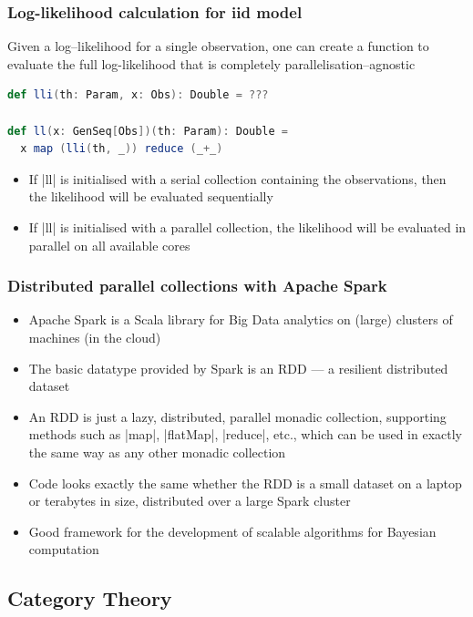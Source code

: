 \documentclass[mathserif,handout]{beamer}
\begin{document}
\begin{frame}[fragile]
  \frametitle{Log-likelihood calculation for iid model}
Given a log--likelihood for a single observation, one can create a function to evaluate the full log-likelihood that is completely \alert{parallelisation--agnostic}
\begin{lstlisting}[language=scala]
def lli(th: Param, x: Obs): Double = ???

def ll(x: GenSeq[Obs])(th: Param): Double =
  x map (lli(th, _)) reduce (_+_)
\end{lstlisting}
\begin{itemize}
\item If |ll| is initialised with a serial collection containing the observations, then the likelihood will be evaluated sequentially
\item If |ll| is initialised with a parallel collection, the likelihood will be evaluated in parallel on all available cores
\end{itemize}
\end{frame}

\begin{frame}[fragile]
  \frametitle{Distributed parallel collections with Apache Spark}
  \begin{itemize}
  \item \alert{Apache Spark} is a Scala library for Big Data analytics on (large) clusters of machines (in the cloud)
  \item The basic datatype provided by Spark is an \alert{RDD} --- a resilient distributed dataset
  \item An RDD is just a \alert{lazy}, \alert{distributed}, parallel monadic collection, supporting methods such as |map|, |flatMap|, |reduce|, etc., which can be used in exactly the same way as any other monadic collection
  \item Code looks exactly the same whether the RDD is a small dataset on a laptop or terabytes in size, distributed over a large Spark cluster
    \item Good framework for the development of scalable algorithms for Bayesian computation
  \end{itemize}
\end{frame}

\subsection{Category Theory}
\end{document}
